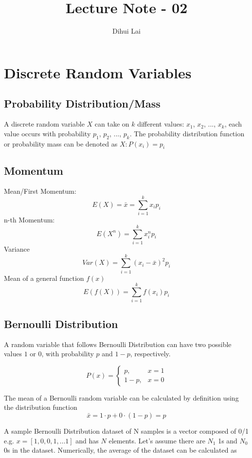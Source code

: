 \documentclass[12pt, oneside]{article}
\title{Lecture Note - 02}
\author{Dihui Lai}
\begin{document}
\maketitle
\tableofcontents

\vspace{.25in}

\section{Discrete Random Variables}

\subsection{Probability Distribution/Mass}

A discrete random variable $X$ can take on $k$ different values: $x_1$, $x_2$, ..., $x_k$, each value occurs with probability $p_1$, $p_2$, ..., $p_k$. The probability distribution function or probability mass can be denoted as $X: P(x_i)=p_i$

\subsection{Momentum}

Mean/First Momentum:
$$E(X)=\bar{x}=\sum\limits_{i=1}^k x_i p_i$$
n-th Momentum:
$$E(X^n)=\sum\limits_{i=1}^k x_i^n p_i$$
Variance
$$Var(X)=\sum\limits_{i=1}^k (x_i-\bar{x})^2 p_i$$
Mean of a general function $f(x)$
$$E(f(X))=\sum\limits_{i=1}^k f(x_i) p_i$$

\subsection{Bernoulli Distribution}
A random variable that follows Bernoulli Distribution can have two possible values $1$ or $0$, with probability $p$ and $1-p$, respectively.

\begin{equation}
P(x)=
\begin{cases}
p, &x=1\\
1-p, &x=0
\end{cases}
\end{equation}

The mean of a Bernoulli random variable can be calculated by definition using the distribution function 
$$\bar{x}=1\cdot p+0\cdot(1-p)=p$$

A sample Bernoulli Distribution dataset of N samples is a vector composed of 0/1 e.g. $x=[1, 0, 0, 1, ...1]$ and has $N$ elements. Let's assume there are $N_1$ 1s and $N_0$ 0s in the dataset. Numerically, the average of the dataset can be calculated as 
\end{document}
